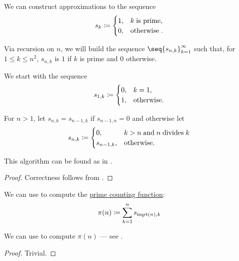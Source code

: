 \begin{algorithm}\label{alg:sieve_of_eratosthenes}
  We can construct approximations to the sequence
  \begin{equation*}
    s_k \coloneqq \begin{cases}
      1, &k \T{is prime}, \\
      0, &\T{otherwise}.
    \end{cases}
  \end{equation*}

  Via recursion on \( n \), we will build the sequence \( \seq{ s_{n,k} }_{k=1}^\infty \) such that, for \( 1 \leq k \leq n^2 \), \( s_{n,k} \) is \( 1 \) if \( k \) is prime and \( 0 \) otherwise.

  \begin{thmenum}
     We start with the sequence
    \begin{equation*}
      s_{1,k} \coloneqq \begin{cases}
        0, &k = 1, \\
        1, &\T{otherwise.}
      \end{cases}
    \end{equation*}

     For \( n > 1 \), let \( s_{n,k} = s_{n-1,k} \) if \( s_{n-1,n} = 0 \) and otherwise let
    \begin{equation*}
      s_{n,k} \coloneqq \begin{cases}
        0,         &k > n \T{and} n \T{divides} k \\
        s_{n-1,k}, &\T{otherwise.}
      \end{cases}
    \end{equation*}
  \end{thmenum}
\end{algorithm}
\begin{comments}
  \item This algorithm can be found as  in \cite{notebook:code}.
\end{comments}
\begin{proof}
  Correctness follows from .
\end{proof}

\begin{proposition}\label{thm:prime_counting_sieve}
  We can use  to compute the \hyperref[def:prime_counting_function]{prime counting function}:
  \begin{equation*}
    \pi(n) \coloneqq \sum_{k=1}^n s_{\op{isqrt}(n),k}
  \end{equation*}
\end{proposition}
\begin{comments}
  \item We can use  to compute \( \pi(n) \) --- see .
\end{comments}
\begin{proof}
  Trivial.
\end{proof}

